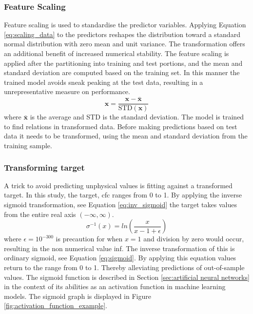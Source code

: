 \subsubsection{Feature Scaling} \label{sec:scaling_predictors}
Feature scaling is used to standardise the predictor variables.
Applying Equation \eqref{eq:scaling_data} to the predictors reshapes the distribution toward a standard normal distribution with zero mean and unit variance. 
The transformation offers an additional benefit of increased numerical stability. %
The feature scaling is applied after the partitioning into training and test portions, and the mean and standard deviation are computed based on the training set. In this manner the trained model avoids sneak peaking at the test data, resulting in a unrepresentative measure on performance.
\begin{equation} \label{eq:scaling_data}
    \mathbf{x} = \frac{\mathbf{x} - \bar{\mathbf{x}}}{\text{STD}(\mathbf{x})}
\end{equation}
where $\bar{\mathbf{x}}$ is the average and STD is the standard deviation. 
The model is trained to find relations in transformed data. Before making predictions based on test data it needs to be transformed, using the mean and standard deviation from the training sample.

\subsubsection{Transforming target} \label{sec:transforming_target}
A trick to avoid predicting unphysical values is fitting against a transformed target. In this study, the target, \acrfull{cfc} ranges from 0 to 1. By applying the inverse sigmoid transformation, see Equation \eqref{eq:inv_sigmoid} the target takes values from the entire real axis $(-\infty, \infty)$. 
\begin{equation} \label{eq:inv_sigmoid}
   \sigma^{-1} \left( x \right) = ln \left(\frac{x}{x - 1 + \epsilon} \right)
\end{equation}
where $\epsilon = 10^{-300}$ is precaution for when $x=1$ and division by zero would occur, resulting in the non numerical value inf. The inverse transformation of this is ordinary sigmoid, see Equation \eqref{eq:sigmoid}. By applying this equation values return to the range from 0 to 1. Thereby alleviating predictions of out-of-sample values. The sigmoid function is described in Section \ref{sec:artificial neural networks} in the context of its abilities as an activation function in machine learning models. The sigmoid graph is displayed in Figure \ref{fig:activation_function_example}.

